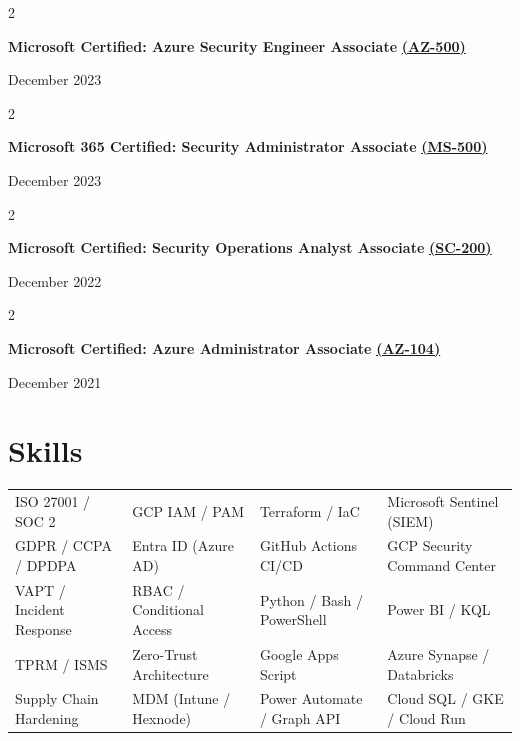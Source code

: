 \documentclass[10pt, letterpaper]{article}
\newenvironment{twocolentry}[2][]{
    \onecolentry
    \def\secondColumn{#2}
    \setcolumnwidth{\fill, 4.5 cm}
    \begin{paracol}{2}
}{
    \switchcolumn \raggedleft \secondColumn
    \end{paracol}
    \endonecolentry
}
\begin{document}
\vspace{0.05 cm}
\begin{twocolentry}{December 2023}
    \textbf{Microsoft Certified: Azure Security Engineer Associate} \href{https://learn.microsoft.com/en-us/users/ChinmayDhokMAQSoftware-5822/credentials/AB3913F87040CE9}{\textbf{(AZ-500)}}
\end{twocolentry}

\vspace{0.05 cm}
\begin{twocolentry}{December 2023}
    \textbf{Microsoft 365 Certified: Security Administrator Associate} \href{https://learn.microsoft.com/en-us/users/chinmaydhokmaqsoftware-5822/credentials/c0ae1a2902b51750}{\textbf{(MS-500)}}
\end{twocolentry}

\vspace{0.05 cm}
\begin{twocolentry}{December 2022}
    \textbf{Microsoft Certified: Security Operations Analyst Associate} \href{https://learn.microsoft.com/en-us/users/ChinmayDhokMAQSoftware-5822/credentials/E22E4108C28D9FF2}{\textbf{(SC-200)}}
\end{twocolentry}

\vspace{0.05 cm}
\begin{twocolentry}{December 2021}
    \textbf{Microsoft Certified: Azure Administrator Associate} \href{https://learn.microsoft.com/en-us/users/chinmaydhokmaqsoftware-5822/credentials/ccf1857230b93a53}{\textbf{(AZ-104)}}
\end{twocolentry}


\section*{Skills}

\vspace{0.2cm}

\noindent\begin{tabularx}{\textwidth}{@{} >{\raggedright\arraybackslash}X >{\raggedright\arraybackslash}X >{\raggedright\arraybackslash}X >{\raggedright\arraybackslash}X @{}}
ISO 27001 / SOC 2         & GCP IAM / PAM              & Terraform / IaC            & Microsoft Sentinel (SIEM) \\
GDPR / CCPA / DPDPA       & Entra ID (Azure AD)        & GitHub Actions CI/CD       & GCP Security Command Center \\
VAPT / Incident Response  & RBAC / Conditional Access   & Python / Bash / PowerShell & Power BI / KQL \\
TPRM / ISMS               & Zero-Trust Architecture     & Google Apps Script         & Azure Synapse / Databricks \\
Supply Chain Hardening    & MDM (Intune / Hexnode)      & Power Automate / Graph API & Cloud SQL / GKE / Cloud Run \\
\end{tabularx}
\end{document}
